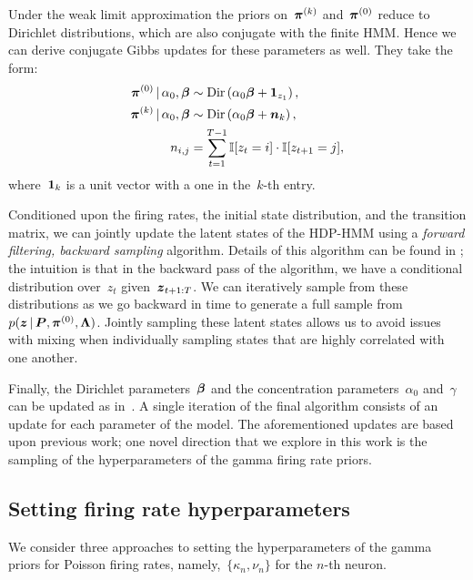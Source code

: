 Under the weak limit approximation the priors on~$\boldsymbol{\pi}^{(k)}$
and~$\boldsymbol{\pi}^{(0)}$ reduce to Dirichlet distributions, which are also conjugate
with the finite HMM. Hence we can derive conjugate Gibbs updates for
these parameters as well. They take the form:
\begin{align*}
  \boldsymbol{\pi}^{(0)} \,|\, \alpha_0, \boldsymbol{\beta} &\sim \mathrm{Dir}\left(\alpha_0\boldsymbol{\beta} + \boldsymbol{1}_{z_1}\right),\\
  \boldsymbol{\pi}^{(k)} \,|\, \alpha_0, \boldsymbol{\beta} &\sim \mathrm{Dir}\left(\alpha_0\boldsymbol{\beta} + \boldsymbol{n}_{k}\right),\\
  n_{i,j}&=\sum_{t=1}^{T-1} \mathbb{I}[z_t=i] \cdot \mathbb{I}[z_{t+1}=j],
\end{align*}
where~$\boldsymbol{1}_k$ is a unit vector with a one in the~$k$-th entry.

Conditioned upon the firing rates, the initial state distribution, and
the transition matrix, we can jointly update the latent states of the
HDP-HMM using a {\em forward filtering, backward sampling}
algorithm. Details of this algorithm can be found in
\citet[e.g.]{Johnson14b}; the intuition is that in the backward pass of the
algorithm, we have a conditional distribution over~$z_t$
given~$\boldsymbol{z}_{t+1:T}$. We can iteratively sample from these distributions
as we go backward in time to generate a full sample
from~${p(\boldsymbol{z} \,|\, \boldsymbol{P}, \boldsymbol{\pi}^{(0)}, \boldsymbol{\Lambda})}$. Jointly sampling
these latent states allows us to avoid issues with mixing when
individually sampling states that are highly correlated with one
another.

Finally, the Dirichlet parameters~$\boldsymbol{\beta}$ and the concentration
parameters~$\alpha_0$ and~$\gamma$ can be updated as
in~\citep{Teh06}. A single iteration of the final algorithm consists
of an update for each parameter of the model. The aforementioned
updates are based upon previous work; one novel direction that we
explore in this work is the sampling of the hyperparameters of the
gamma firing rate priors.

\subsection{Setting firing rate hyperparameters} 
\label{sec:fr_hypers}
We consider three approaches to setting the hyperparameters of the
gamma priors for Poisson firing rates, namely,~${\{\kappa_n,
  \nu_n\}}$ for the $n$-th neuron.  

